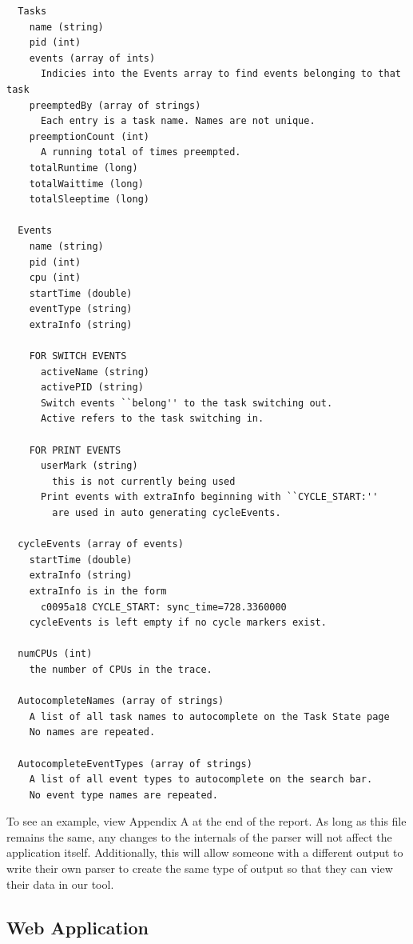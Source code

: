 \documentclass{hmcclinic}
\begin{document}
  \begin{verbatim}
  Tasks
    name (string)
    pid (int)
    events (array of ints)
      Indicies into the Events array to find events belonging to that task
    preemptedBy (array of strings)
      Each entry is a task name. Names are not unique.
    preemptionCount (int)
      A running total of times preempted.
    totalRuntime (long)
    totalWaittime (long)
    totalSleeptime (long)

  Events
    name (string)
    pid (int)
    cpu (int)
    startTime (double)
    eventType (string)
    extraInfo (string)

    FOR SWITCH EVENTS
      activeName (string)
      activePID (string)
      Switch events ``belong'' to the task switching out.
      Active refers to the task switching in.

    FOR PRINT EVENTS
      userMark (string)
        this is not currently being used
      Print events with extraInfo beginning with ``CYCLE_START:''
        are used in auto generating cycleEvents.

  cycleEvents (array of events)
    startTime (double)
    extraInfo (string)
    extraInfo is in the form
      c0095a18 CYCLE_START: sync_time=728.3360000
    cycleEvents is left empty if no cycle markers exist.

  numCPUs (int)
    the number of CPUs in the trace.

  AutocompleteNames (array of strings)
    A list of all task names to autocomplete on the Task State page
    No names are repeated.

  AutocompleteEventTypes (array of strings)
    A list of all event types to autocomplete on the search bar.
    No event type names are repeated.

  \end{verbatim}

  To see an example, view Appendix A at the end of the report.
  \newline
  \newline
  As long as this file remains the same, any changes to the internals of the
  parser will not affect the application itself. Additionally, this will allow
  someone with a different output to write their own parser to create the same
  type of output so that they can view their data in our tool.

  \subsection{Web Application}
\end{document}

